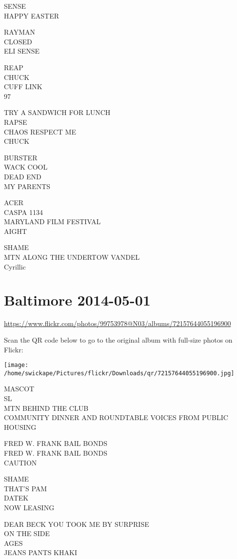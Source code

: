 \documentclass[10pt,letterpaper]{article}
\begin{document}
SENSE\\
HAPPY EASTER

RAYMAN\\
CLOSED\\
ELI SENSE

REAP\\
CHUCK\\
CUFF LINK\\
97

TRY A SANDWICH FOR LUNCH\\
RAPSE\\
CHAOS RESPECT ME\\
CHUCK

BURSTER\\
WACK COOL\\
DEAD END\\
MY PARENTS

ACER\\
CASPA 1134\\
MARYLAND FILM FESTIVAL\\
AIGHT

SHAME\\
MTN ALONG THE UNDERTOW VANDEL\\
Cyrillic
\pagebreak

\section*{Baltimore 2014-05-01}

\url{https://www.flickr.com/photos/99753978@N03/albums/72157644055196900}

Scan the QR code below to go to the original album with full-size photos on Flickr:

\texttt{[image: /home/swickape/Pictures/flickr/Downloads/qr/72157644055196900.jpg]}
\pagebreak

MASCOT\\
SL\\
MTN BEHIND THE CLUB\\
COMMUNITY DINNER AND ROUNDTABLE VOICES FROM PUBLIC HOUSING

FRED W. FRANK BAIL BONDS\\
FRED W. FRANK BAIL BONDS\\
CAUTION

SHAME\\
THAT'S PAM\\
DATEK\\
NOW LEASING

DEAR BECK YOU TOOK ME BY SURPRISE\\
ON THE SIDE\\
AGES\\
JEANS PANTS KHAKI
\end{document}
